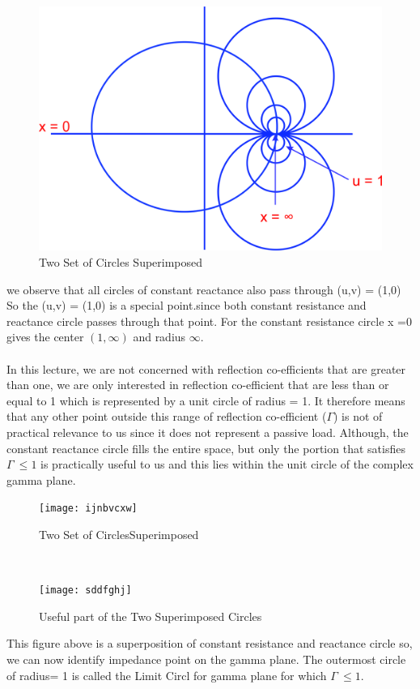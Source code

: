 \begin{figure}[h]
\centering
\includegraphics[width=0.5\linewidth]{./graphics/uytrdbn}
\caption{Two Set of Circles Superimposed}
\label{fig:uytrdbn}
\end{figure}
we observe that all circles of constant reactance also pass through (u,v) = (1,0)\\
So the (u,v) = (1,0) is a special point.since both constant resistance and reactance circle passes through that point. For the constant resistance circle x =0 gives the center $(1,\infty)$ and radius $\infty$. \\\\ 
In this lecture, we are not concerned with reflection co-efficients that are greater than one, we are only interested in reflection co-efficient that are less than or equal to 1 which is represented by a unit circle of radius = 1. It therefore means that any other point outside this range of reflection co-efficient ($\Gamma$) is not of practical relevance to us since it does not represent a passive load.  Although, the constant reactance circle fills the entire space, but only the portion that satisfies $ \Gamma\ \leq 1$ is practically useful to us and this lies within the unit circle of the complex gamma plane.\\
\begin{figure}[h]
\centering
\texttt{[image: ijnbvcxw]}
\caption{Two Set of CirclesSuperimposed}
\label{fig:ijnbvcxw}
\end{figure}\\
\begin{figure}[h]
\centering
\texttt{[image: sddfghj]}
\caption{Useful part of the Two Superimposed Circles}
\label{fig:sddfghj}
\end{figure}

This figure above is a superposition of constant resistance and reactance circle so, we can now identify impedance point on the gamma plane.  The outermost circle of radius= 1 is called the Limit Circl for gamma plane for which $ \Gamma\ \leq 1$.\\


